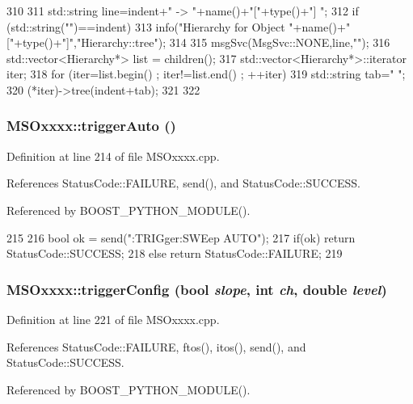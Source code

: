 \begin{DoxyCode}
310                                     {
311   std::string line=indent+" -> "+name()+"["+type()+"] ";
312   if (std::string("")==indent){
313     info("Hierarchy for Object "+name()+"["+type()+"]","Hierarchy::tree");
314   }
315   msgSvc(MsgSvc::NONE,line,"");
316   std::vector<Hierarchy*> list = children();
317   std::vector<Hierarchy*>::iterator iter;
318   for (iter=list.begin() ; iter!=list.end() ; ++iter){
319     std::string tab="  ";
320     (*iter)->tree(indent+tab);
321   }
322 }
\end{DoxyCode}
\hypertarget{classMSOxxxx_a44238c713464e76d4c3c2005413bdf76}{
\subsubsection[{triggerAuto}]{ MSOxxxx::triggerAuto ()}}
\label{classMSOxxxx_a44238c713464e76d4c3c2005413bdf76}


Definition at line 214 of file MSOxxxx.cpp.

References StatusCode::FAILURE, send(), and StatusCode::SUCCESS.

Referenced by BOOST\_\-PYTHON\_\-MODULE().


\begin{DoxyCode}
215 {
216     bool ok = send(":TRIGger:SWEep AUTO\n");
217     if(ok)  return StatusCode::SUCCESS;
218     else        return StatusCode::FAILURE; 
219 }
\end{DoxyCode}
\hypertarget{classMSOxxxx_a9019b632465638a13c409d8243fe83b4}{
\subsubsection[{triggerConfig}]{ MSOxxxx::triggerConfig (bool {\em slope}, \/  int {\em ch}, \/  double {\em level})}}
\label{classMSOxxxx_a9019b632465638a13c409d8243fe83b4}


Definition at line 221 of file MSOxxxx.cpp.

References StatusCode::FAILURE, ftos(), itos(), send(), and StatusCode::SUCCESS.

Referenced by BOOST\_\-PYTHON\_\-MODULE().


